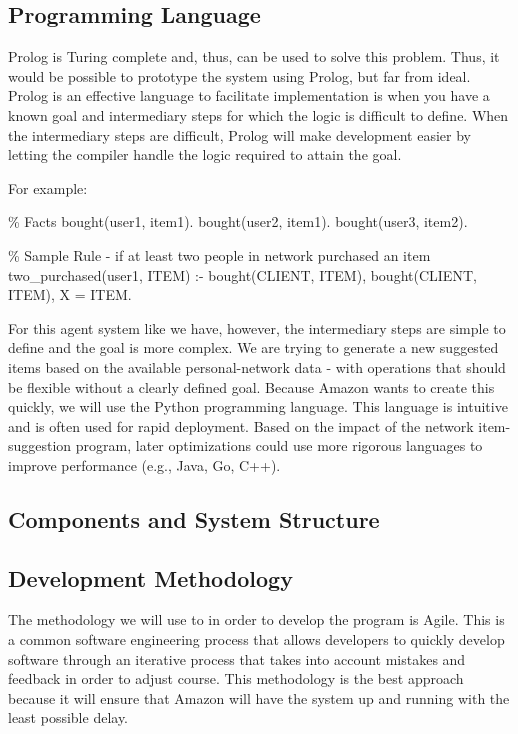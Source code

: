\documentclass[12pt,a4paper]{article}
\begin{document}
	\subsection*{Programming Language}
		Prolog is Turing complete and, thus, can be used to solve this problem. Thus, it would be possible to prototype the system using Prolog, but far from ideal. Prolog is an effective language to facilitate implementation is when you have a known goal and intermediary steps for which the logic is difficult to define. When the intermediary steps are difficult, Prolog will make development easier by letting the compiler handle the logic required to attain the goal. 
		
		For example:
		
		\% Facts
		bought(user1, item1).
		bought(user2, item1).
		bought(user3, item2).
		
		\% Sample Rule - if at least two people in network purchased an item
		two\_purchased(user1, ITEM) :- 
		bought(CLIENT, ITEM), bought(CLIENT, ITEM), X = ITEM.
		
		
		For this agent system like we have, however, the intermediary steps are simple to define and the goal is more complex. We are trying to generate a new suggested items based on the available personal-network data - with operations that should be flexible without a clearly defined goal. Because Amazon wants to create this quickly, we will use the Python programming language. This language is intuitive and is often used for rapid deployment. Based on the impact of the network item-suggestion program, later optimizations could use more rigorous languages to improve performance (e.g., Java, Go, C++).
		
		
		\subsection*{Components and System Structure}
		
		
		
		
		
		\subsection*{Development Methodology}
		
		The methodology we will use to in order to develop the program is Agile. This is a common software engineering process that allows developers to quickly develop software through an iterative process that takes into account mistakes and feedback in order to adjust course. This methodology is the best approach because it will ensure that Amazon will have the system up and running with the least possible delay. 
		
\end{document}
